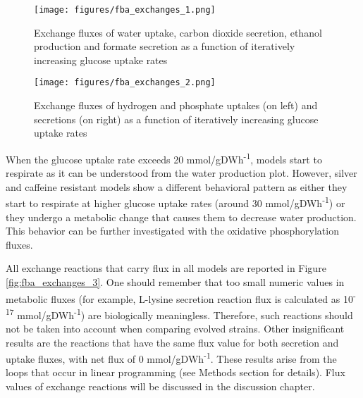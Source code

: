 \begin{figure}[H]
  \begin{center}
  \texttt{[image: figures/fba\_exchanges\_1.png]}
  \caption[Exchange fluxes of water, carbon dioxide, ethanol and formate secretion as a function of iteratively increasing glucose uptake rates]{Exchange fluxes of water uptake, carbon dioxide secretion, ethanol production and formate secretion as a function of iteratively increasing glucose uptake rates}
  \label{fig:fba_exchanges_1}
  \end{center}
  \end{figure}
\vspace{-1.0cm}

\begin{figure}[H]
  \begin{center}
  \texttt{[image: figures/fba\_exchanges\_2.png]}
  \caption[Exchange fluxes of hydrogen and phosphate uptakes (on the left) and secretions (on the right) as a function of iteratively increasing glucose uptake rates]{Exchange fluxes of hydrogen and phosphate uptakes (on left) and secretions (on right) as a function of iteratively increasing glucose uptake rates}
  \label{fig:fba_exchanges_2}
  \end{center}
  \end{figure}
\vspace{-1.0cm}

When the glucose uptake rate exceeds 20 mmol/gDWh\textsuperscript{-1}, models start to respirate as it can be understood from the water production plot. However, silver and caffeine resistant models show a different behavioral pattern as either they start to respirate at higher glucose uptake rates (around 30 mmol/gDWh\textsuperscript{-1}) or they undergo a metabolic change that causes them to decrease water production. This behavior can be further  investigated with the oxidative phosphorylation fluxes.

All exchange reactions that carry flux in all models are reported in Figure \ref{fig:fba_exchanges_3}. One should remember that too small numeric values in metabolic fluxes (for example, L-lysine secretion reaction flux is calculated as 10\textsuperscript{-17} mmol/gDWh\textsuperscript{-1}) are biologically meaningless. Therefore, such reactions should not be taken into account when comparing evolved strains. Other insignificant results are the reactions that have the same flux value for both secretion and uptake fluxes, with net flux of 0 mmol/gDWh\textsuperscript{-1}. These results arise from the loops that occur in linear programming (see Methods section for details). Flux values of exchange reactions will be discussed in the discussion chapter.

